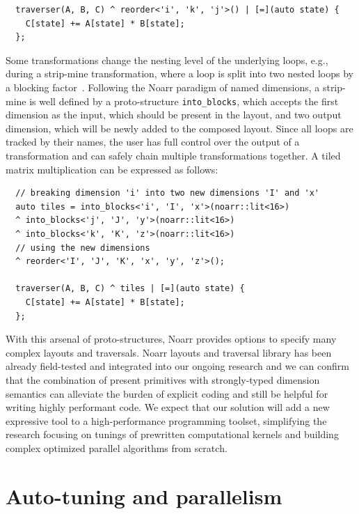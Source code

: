 \begin{verbatim}
  traverser(A, B, C) ^ reorder<'i', 'k', 'j'>() | [=](auto state) {
    C[state] += A[state] * B[state];
  };
\end{verbatim}

Some transformations change the nesting level of the underlying loops, e.g., during a strip-mine transformation, where a loop is split into two nested loops by a blocking factor~\cite{mckinley1996improving}. Following the Noarr paradigm of named dimensions, a strip-mine is well defined by a proto-structure \texttt{into_blocks}, which accepts the first dimension as the input, which should be present in the layout, and two output dimension, which will be newly added to the composed layout. Since all loops are tracked by their names, the user has full control over the output of a transformation and can safely chain multiple transformations together. A tiled matrix multiplication can be expressed as follows:
\begin{verbatim}
  // breaking dimension 'i' into two new dimensions 'I' and 'x'
  auto tiles = into_blocks<'i', 'I', 'x'>(noarr::lit<16>)
  ^ into_blocks<'j', 'J', 'y'>(noarr::lit<16>)
  ^ into_blocks<'k', 'K', 'z'>(noarr::lit<16>)
  // using the new dimensions
  ^ reorder<'I', 'J', 'K', 'x', 'y', 'z'>(); 

  traverser(A, B, C) ^ tiles | [=](auto state) {
    C[state] += A[state] * B[state];
  }; 
\end{verbatim}

With this arsenal of proto-structures, Noarr provides options to specify many complex layouts and traversals. Noarr layouts and traversal library has been already field-tested and integrated into our ongoing research and we can confirm that the combination of present primitives with strongly-typed dimension semantics can alleviate the burden of explicit coding and still be helpful for writing highly performant code. We expect that our solution will add a new expressive tool to a high-performance programming toolset, simplifying the research focusing on tunings of prewritten computational kernels and building complex optimized parallel algorithms from scratch.

\section{Auto-tuning and parallelism}

